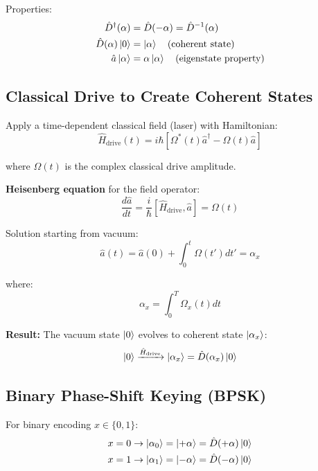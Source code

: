 \documentclass[12pt,a4paper]{article}
\begin{document}
Properties:
\begin{align}
\hat{D}^\dagger(\alpha) &= \hat{D}(-\alpha) = \hat{D}^{-1}(\alpha)\\
\hat{D}(\alpha)\ket{0} &= \ket{\alpha} \quad \text{(coherent state)}\\
\hat{a}\ket{\alpha} &= \alpha\ket{\alpha} \quad \text{(eigenstate property)}
\end{align}

\subsection{Classical Drive to Create Coherent States}

Apply a time-dependent classical field (laser) with Hamiltonian:
\begin{equation}
\hat{H}_{\text{drive}}(t) = i\hbar\left[\Omega^*(t)\hat{a}^\dagger - \Omega(t)\hat{a}\right] \label{eq:H_drive}
\end{equation}

where $\Omega(t)$ is the complex classical drive amplitude.

\textbf{Heisenberg equation} for the field operator:
\begin{equation}
\frac{d\hat{a}}{dt} = \frac{i}{\hbar}[\hat{H}_{\text{drive}}, \hat{a}] = \Omega(t)
\end{equation}

Solution starting from vacuum:
\begin{equation}
\hat{a}(t) = \hat{a}(0) + \int_0^t \Omega(t') dt' = \alpha_x
\end{equation}

where:
\begin{equation}
\alpha_x = \int_0^{T} \Omega_x(t) dt \label{eq:coherent_amplitude}
\end{equation}

\textbf{Result:} The vacuum state $\ket{0}$ evolves to coherent state $\ket{\alpha_x}$:
\begin{equation}
\ket{0} \xrightarrow{\hat{H}_{\text{drive}}} \ket{\alpha_x} = \hat{D}(\alpha_x)\ket{0}
\end{equation}

\subsection{Binary Phase-Shift Keying (BPSK)}

For binary encoding $x \in \{0, 1\}$:
\begin{align}
x = 0 &\rightarrow \ket{\alpha_0} = \ket{+\alpha} = \hat{D}(+\alpha)\ket{0}\\
x = 1 &\rightarrow \ket{\alpha_1} = \ket{-\alpha} = \hat{D}(-\alpha)\ket{0}
\end{align}
\end{document}
